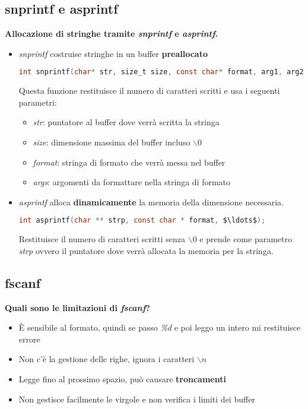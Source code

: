 \subsection{snprintf e asprintf}
\textbf{Allocazione di stringhe tramite \textit{snprintf} e \textit{asprintf}.}\\
\begin{itemize}
	\item \textit{snprintf} costruise stringhe in un buffer \textbf{preallocato}
	\begin{lstlisting}[language=C]
		int snprintf(char* str, size_t size, const char* format, arg1, arg2, ...);
	\end{lstlisting}
	Questa funzione restituisce il numero di caratteri scritti e usa i seguenti parametri:
	\begin{itemize}
		\item \textit{str}: puntatore al buffer dove verrà scritta la stringa
		\item \textit{size}: dimensione massima del buffer incluso \textit{$\backslash 0$}
		\item \textit{format}: stringa di formato che verrà messa nel buffer
		\item \textit{args}: argomenti da formattare nella stringa di formato
	\end{itemize}
	\item  \textit{asprintf} alloca \textbf{dinamicamente} la memoria della dimensione necessaria.
	\begin{lstlisting}[language=C, mathescape]
		int asprintf(char ** strp, const char * format, $\ldots$);
	\end{lstlisting}
	Restituisce il numero di caratteri scritti senza $\backslash 0$ e prende come parametro \textit{strp} ovvero il puntatore dove verrà allocata la memoria per la stringa.
\end{itemize}
\subsection{fscanf}
\textbf{Quali sono le limitazioni di \textit{fscanf}?}\\
\begin{itemize}
	\item È sensibile al formato, quindi se passo \textit{\%d} e poi leggo un intero mi restituisce errore
	\item Non c'è la gestione delle righe, ignora i caratteri \textit{$\backslash n$}
	\item Legge fino al prossimo spazio, può causare \textbf{troncamenti}
	\item Non gestisce facilmente le virgole e non verifica i limiti dei buffer
\end{itemize}
